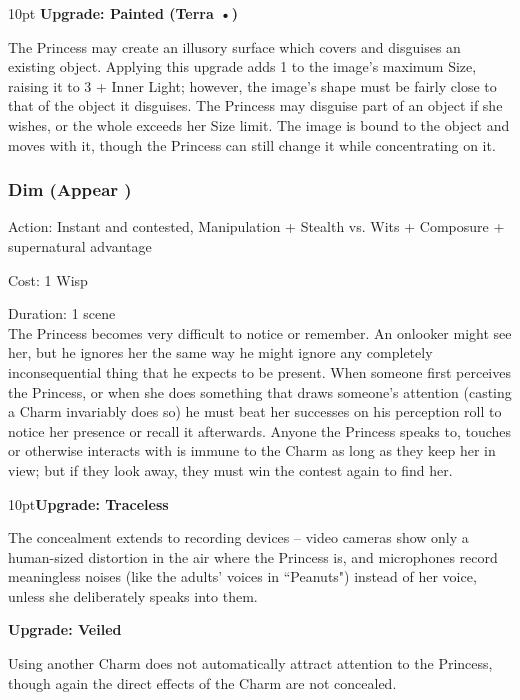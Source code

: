 \begin{myindentpar}{10pt}
\textbf{Upgrade: Painted (Terra •)}

The Princess may create an illusory surface which covers and disguises an existing object. Applying this upgrade adds 1 to the image’s maximum Size, raising it to 3 + Inner Light;
however, the image’s shape must be fairly close to that of the object it disguises. The Princess
may disguise part of an object if she wishes, or the whole exceeds her Size limit. The image is
bound to the object and moves with it, though the Princess can still change it while concentrating on it.

\end{myindentpar}
\subsubsection*{Dim (Appear \textbullet\textbullet)}
\noindent Action: Instant and contested, Manipulation + Stealth vs. Wits + Composure + supernatural advantage

\noindent Cost: 1 Wisp

\noindent Duration: 1 scene \\

\noindent The Princess becomes very difficult to notice or remember. An onlooker might see her, but he ignores her the same way he might ignore any completely inconsequential thing that he expects to be present. When someone first perceives the Princess, or when she does something that draws someone's attention (casting a Charm invariably does so) he must beat her successes on his perception roll to notice her presence or recall it afterwards. Anyone the Princess speaks to, touches or otherwise interacts with is immune to the Charm as long as they keep her in view; but if they look away, they must win the contest again to find her.

\begin{myindentpar}{10pt}\textbf{Upgrade: Traceless}

The concealment extends to recording devices -- video cameras show only a human-sized distortion in the air where the Princess is, and microphones record meaningless noises (like the adults' voices in \textquotedblleft Peanuts") instead of her voice, unless she deliberately speaks into them.

\textbf{Upgrade: Veiled}

Using another Charm does not automatically attract attention to the Princess, though again the direct effects of the Charm are not concealed.\end{myindentpar}

